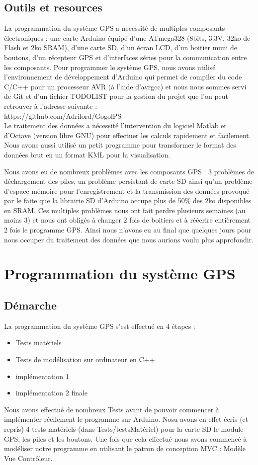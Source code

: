 \documentclass{report}
\begin{document}
\section{Outils et resources}
La programmation du système GPS a necessité de multiples composants
électroniques : une carte Arduino équipé d'une ATmega328 (8bits, 3.3V,
32ko de Flash et 2ko SRAM), d'une carte SD, d'un écran LCD, d'un boitier
muni de boutons, d'un récepteur GPS et d'interfaces séries pour la 
communication entre les composants. Pour programmer le système GPS, nous
avons utilisé l'environnement de développement d'Arduino qui permet de
compiler du code C/C++ pour un processeur AVR (à l'aide d'avrgcc) et nous
nous sommes servi de Git et d'un fichier TODOLIST
 pour la gestion du projet que l'on peut retrouver
à l'adresse suivante : \\
https://github.com/Adrilord/GogolPS \\

Le traitement des données a nécessité l'intervention du logiciel Matlab
et d'Octave (version libre GNU)
pour effectuer les calculs rapidement et facilement. Nous avons aussi
utilisé un petit programme pour transformer le format des données brut
en un format KML pour la visualisation.

Nous avons eu de nombreux problèmes avec les composants GPS : 3 problèmes
de déchargement des piles, un problème persistant de carte SD ainsi qu'un
problème d'espace mémoire pour l'enregistrement et la transmission des
données provoqué par le faite que la librairie SD d'Arduino occupe plus
de 50\% des 2ko disponibles en SRAM. Ces multiples problèmes nous
ont fait perdre plusieurs semaines (au moins 3) et nous ont obligés à changer
2 fois de boitiers et à réécrire entièrement 2 fois le programme GPS. 
Ainsi nous n'avons eu au final que quelques jours pour nous occuper
du traitement des données que nous aurions voulu plus approfondir.

\chapter{Programmation du système GPS}
\section{Démarche}
La programmation du système GPS s'est effectué en 4 étapes :
\begin{itemize}
 \item Tests matériels
 \item Tests de modélisation sur ordinateur en C++
 \item implémentation 1 
 \item implémentation 2 finale
 \end{itemize}
Nous avons effectué de nombreux Tests avant de pouvoir commencer
à implémenter réellement le programme sur Arduino. Nosu avons en effet
écris (et repris) 4 tests matériels (dans Tests/testsMatériel) pour la carte SD
le module GPS, les piles et les boutons. 
Une fois que cela effectué nous avons commencé à modéliser notre 
programme en utilisant le patron de conception MVC : Modèle Vue Contrôleur.
\end{document}
